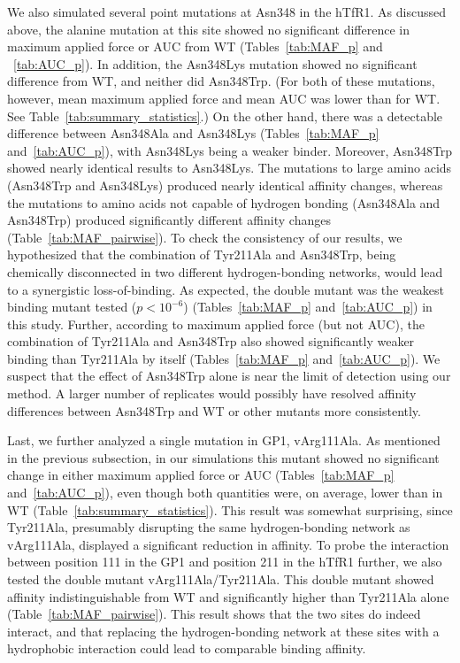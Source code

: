 \documentclass[12pt]{article}
\begin{document}
We also simulated several point mutations at Asn348 in the hTfR1. As discussed above, the alanine mutation at this site showed no significant difference in maximum applied force or AUC from WT (Tables~\ref{tab:MAF_p} and ~\ref{tab:AUC_p}). In addition, the Asn348Lys mutation showed no significant difference from WT, and neither did Asn348Trp. (For both of these mutations, however, mean maximum applied force and mean AUC was lower than for WT. See Table~\ref{tab:summary_statistics}.)  On the other hand, there was a detectable difference between Asn348Ala and Asn348Lys (Tables~\ref{tab:MAF_p} and~\ref{tab:AUC_p}), with Asn348Lys being a weaker binder. Moreover, Asn348Trp showed nearly identical results to Asn348Lys. The mutations to large amino acids (Asn348Trp and Asn348Lys) produced nearly identical affinity changes, whereas the mutations to amino acids not capable of hydrogen bonding (Asn348Ala and Asn348Trp) produced significantly different affinity changes (Table~\ref{tab:MAF_pairwise}). To check the consistency of our results, we hypothesized that the combination of Tyr211Ala and Asn348Trp, being chemically disconnected in two different hydrogen-bonding networks, would lead to a synergistic loss-of-binding. As expected, the double mutant was the weakest binding mutant tested ($ p < 10^{-6} $) (Tables~\ref{tab:MAF_p} and~\ref{tab:AUC_p}) in this study. Further, according to maximum applied force (but not AUC), the combination of Tyr211Ala and Asn348Trp also showed significantly weaker binding than Tyr211Ala by itself (Tables~\ref{tab:MAF_p} and~\ref{tab:AUC_p}). We suspect that the effect of Asn348Trp alone is near the limit of detection using our method. A larger number of replicates would possibly have resolved affinity differences between Asn348Trp and WT or other mutants more consistently.

Last, we further analyzed a single mutation in GP1, vArg111Ala. As mentioned in the previous subsection, in our simulations this mutant showed no significant change in either maximum applied force or AUC (Tables~\ref{tab:MAF_p} and~\ref{tab:AUC_p}), even though both quantities were, on average, lower than in WT (Table~\ref{tab:summary_statistics}). This result was somewhat surprising, since Tyr211Ala, presumably disrupting the same hydrogen-bonding network as vArg111Ala, displayed a significant reduction in affinity. To probe the interaction between position 111 in the GP1 and position 211 in the hTfR1 further, we also tested the double mutant vArg111Ala/Tyr211Ala. This double mutant showed affinity indistinguishable from WT and significantly higher than Tyr211Ala alone  (Table~\ref{tab:MAF_pairwise}). This result shows that the two sites do indeed interact, and that replacing the hydrogen-bonding network at these sites with a hydrophobic interaction could lead to comparable binding affinity.
\end{document}
